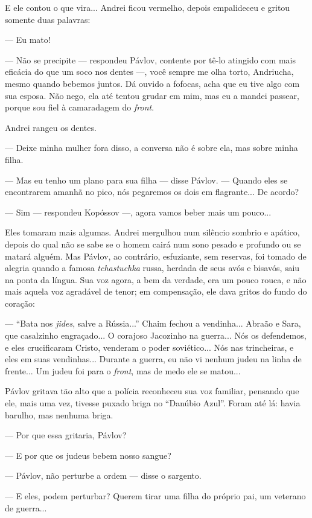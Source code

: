 E ele contou o que vira... Andrei ficou vermelho, depois empalideceu e
gritou somente duas palavras:

--- Eu mato!

--- Não se precipite --- respondeu Pávlov, contente por tê-lo atingido
com mais eficácia do que um soco nos dentes ---, você sempre me olha
torto, Andriucha, mesmo quando bebemos juntos. Dá ouvido a fofocas, acha
que eu tive algo com sua esposa. Não nego, ela até tentou grudar em mim,
mas eu a mandei passear, porque sou fiel à camaradagem do \emph{front}.

Andrei rangeu os dentes.

--- Deixe minha mulher fora disso, a conversa não é sobre ela, mas sobre
minha filha.

--- Mas eu tenho um plano para sua filha --- disse Pávlov. --- Quando
eles se encontrarem amanhã no pico, nós pegaremos os dois em
flagrante... De acordo?

--- Sim --- respondeu Kopóssov ---, agora vamos beber mais um pouco...

Eles tomaram mais algumas. Andrei mergulhou num silêncio sombrio e
apático, depois do qual não se sabe se o homem cairá num sono pesado e
profundo ou se matará alguém. Mas Pávlov, ao contrário, esfuziante, sem
reservas, foi tomado de alegria quando a famosa \emph{tchastuchka}
russa, herdada dе seus avós e bisavós, saiu na ponta da língua. Sua voz
agora, a bem da verdade, era um pouco rouca, e não mais aquela voz
agradável de tenor; em compensação, ele dava gritos do fundo do coração:

--- ``Bata nos \emph{jides}, salve a Rússia...'' Chaim fechou a
vendinha... Abraão e Sara, que casalzinho engraçado... O corajoso
Jacozinho na guerra... Nós os defendemos, e eles crucificaram Cristo,
venderam o poder soviético... Nós nas trincheiras, e eles em suas
vendinhas... Durante a guerra, eu não vi nenhum judeu na linha de
frente... Um judeu foi para o \emph{front}, mas de medo ele se matou...

Pávlov gritava tão alto que a polícia reconheceu sua voz familiar,
pensando que ele, mais uma vez, tivesse puxado briga no ``Danúbio
Azul''. Foram até lá: havia barulho, mas nenhuma briga.

--- Por que essa gritaria, Pávlov?

--- E por que os judeus bebem nosso sangue?

--- Pávlov, não perturbe a ordem --- disse o sargento.

--- E eles, podem perturbar? Querem tirar uma filha do próprio pai, um
veterano de guerra...

